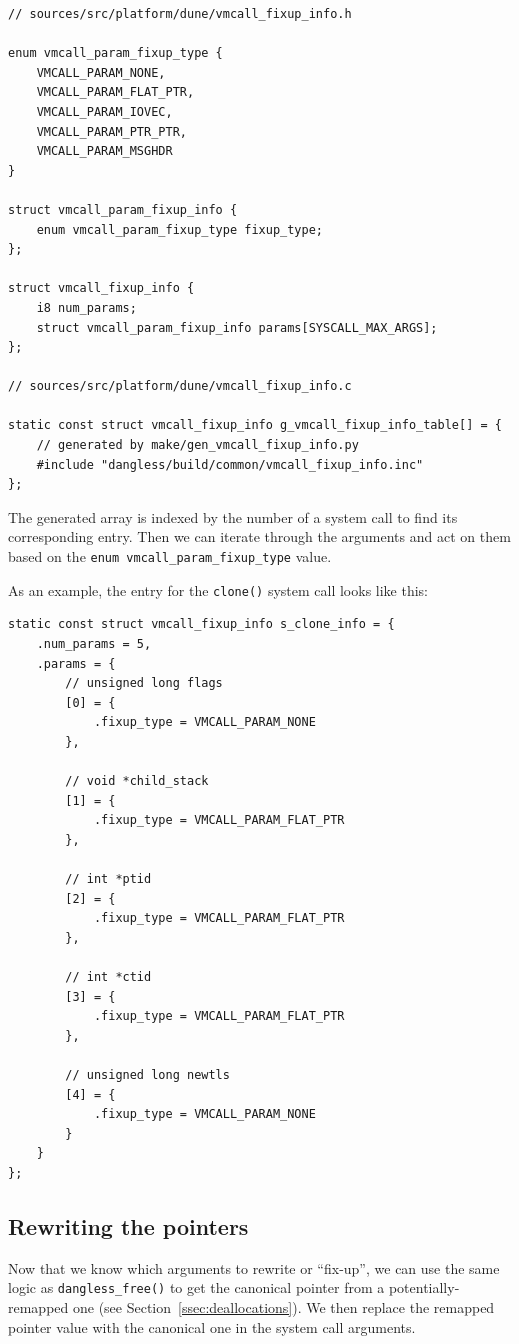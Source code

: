 \begin{lstlisting}
// sources/src/platform/dune/vmcall_fixup_info.h

enum vmcall_param_fixup_type {
	VMCALL_PARAM_NONE,
	VMCALL_PARAM_FLAT_PTR,
	VMCALL_PARAM_IOVEC,
	VMCALL_PARAM_PTR_PTR,
	VMCALL_PARAM_MSGHDR
}

struct vmcall_param_fixup_info {
	enum vmcall_param_fixup_type fixup_type;
};

struct vmcall_fixup_info {
	i8 num_params;
	struct vmcall_param_fixup_info params[SYSCALL_MAX_ARGS];
};

// sources/src/platform/dune/vmcall_fixup_info.c

static const struct vmcall_fixup_info g_vmcall_fixup_info_table[] = {
	// generated by make/gen_vmcall_fixup_info.py
	#include "dangless/build/common/vmcall_fixup_info.inc"
};
\end{lstlisting}

The generated array is indexed by the number of a system call to find its corresponding entry. Then we can iterate through the arguments and act on them based on the \lstinline!enum vmcall_param_fixup_type! value.

As an example, the entry for the \lstinline!clone()! system call looks like this:

\begin{lstlisting}
static const struct vmcall_fixup_info s_clone_info = {
	.num_params = 5,
	.params = {
		// unsigned long flags
		[0] = {
			.fixup_type = VMCALL_PARAM_NONE
		},
		
		// void *child_stack
		[1] = {
			.fixup_type = VMCALL_PARAM_FLAT_PTR
		},
		
		// int *ptid
		[2] = {
			.fixup_type = VMCALL_PARAM_FLAT_PTR
		},
		
		// int *ctid
		[3] = {
			.fixup_type = VMCALL_PARAM_FLAT_PTR
		},
		
		// unsigned long newtls
		[4] = {
			.fixup_type = VMCALL_PARAM_NONE
		}
	}
};
\end{lstlisting}

\subsection{Rewriting the pointers}

Now that we know which arguments to rewrite or ``fix-up'', we can use the same logic as \lstinline!dangless_free()! to get the canonical pointer from a potentially-remapped one (see Section~\ref{ssec:deallocations}). We then replace the remapped pointer value with the canonical one in the system call arguments.


